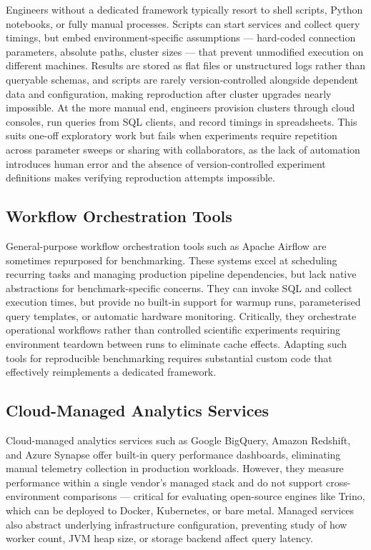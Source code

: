 \documentclass{l4proj}
\begin{document}
Engineers without a dedicated framework typically resort to shell scripts, Python notebooks, or fully manual processes. Scripts can start services and collect query timings, but embed environment-specific assumptions --- hard-coded connection parameters, absolute paths, cluster sizes --- that prevent unmodified execution on different machines. Results are stored as flat files or unstructured logs rather than queryable schemas, and scripts are rarely version-controlled alongside dependent data and configuration, making reproduction after cluster upgrades nearly impossible. At the more manual end, engineers provision clusters through cloud consoles, run queries from SQL clients, and record timings in spreadsheets. This suits one-off exploratory work but fails when experiments require repetition across parameter sweeps or sharing with collaborators, as the lack of automation introduces human error and the absence of version-controlled experiment definitions makes verifying reproduction attempts impossible.

\subsection{Workflow Orchestration Tools}
\label{sec:orchestration_tools}

General-purpose workflow orchestration tools such as Apache Airflow are sometimes repurposed for benchmarking. These systems excel at scheduling recurring tasks and managing production pipeline dependencies, but lack native abstractions for benchmark-specific concerns. They can invoke SQL and collect execution times, but provide no built-in support for warmup runs, parameterised query templates, or automatic hardware monitoring. Critically, they orchestrate operational workflows rather than controlled scientific experiments requiring environment teardown between runs to eliminate cache effects. Adapting such tools for reproducible benchmarking requires substantial custom code that effectively reimplements a dedicated framework.

\subsection{Cloud-Managed Analytics Services}
\label{sec:cloud_services}

Cloud-managed analytics services such as Google BigQuery, Amazon Redshift, and Azure Synapse offer built-in query performance dashboards, eliminating manual telemetry collection in production workloads. However, they measure performance within a single vendor's managed stack and do not support cross-environment comparisons --- critical for evaluating open-source engines like Trino, which can be deployed to Docker, Kubernetes, or bare metal. Managed services also abstract underlying infrastructure configuration, preventing study of how worker count, JVM heap size, or storage backend affect query latency.
\end{document}
